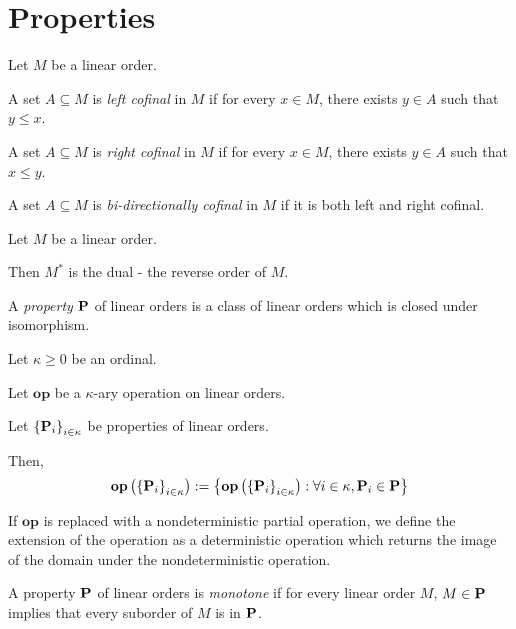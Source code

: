 \section{Properties}
\begin{definition}
  Let $M$ be a linear order.

  A set $A \subseteq M$ is \emph{left cofinal} in $M$ if for every $x \in M$,
  there exists $y \in A$ such that $y \le x$.

  A set $A \subseteq M$ is \emph{right cofinal} in $M$ if for every $x \in M$,
  there exists $y \in A$ such that $x \le y$.

  A set $A \subseteq M$ is \emph{bi-directionally cofinal} in $M$ if it is both left and right cofinal.
\end{definition}

\begin{definition}
  Let $M$ be a linear order.

  Then $M^\ast$ is the dual - the reverse order of $M$.
\end{definition}

\begin{definition}
  A \emph{property} $\mathbf{P}$ of linear orders is a class of linear orders which
  is closed under isomorphism.
\end{definition}


\begin{definition}
  Let $\kappa \ge 0$ be an ordinal.

  Let $\mathbf{op}$ be a $\kappa$-ary operation on linear orders.

  Let $\left\{ {\mathbf{P}_i} \right\}_{i \in \kappa}$ be properties of linear orders.

  Then,
  \[
    \mathbf{op} \left( { \left\{ {\mathbf{P}_i} \right\}_{i \in \kappa} } \right)
    := \left\{ { \mathbf{op} \left( { \left\{ {\mathbf{P}_i} \right\}_{i \in \kappa} } \right) : \forall i \in \kappa, \mathbf{P}_i \in \mathbf{P} } \right\}
  \]

  If $\mathbf{op}$ is replaced with a nondeterministic partial operation, 
  we define the extension of the operation as a deterministic
  operation which returns the image of the domain under the nondeterministic operation.
\end{definition}

\begin{definition}
  A property $\mathbf{P}$ of linear orders is \emph{monotone} if for every linear order $M$,
  $M \in \mathbf{P}$ implies that every suborder of $M$ is in $\mathbf{P}$.
\end{definition}

